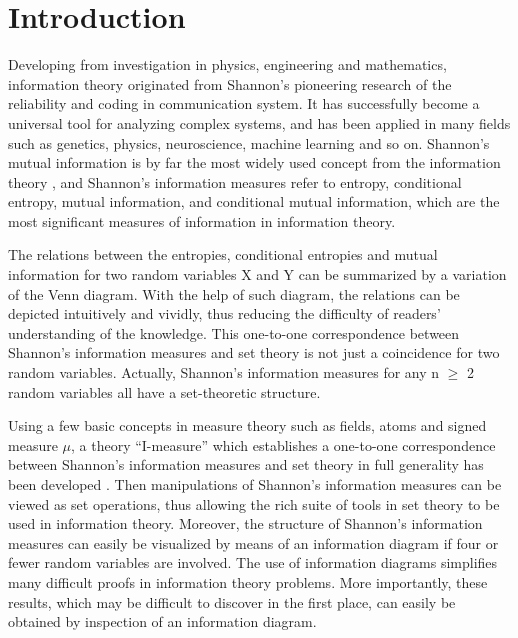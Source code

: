 \section{Introduction}



\qquad Developing from investigation in physics, engineering and mathematics, information theory originated from Shannon's pioneering research of the reliability and coding in communication system. It has successfully become a universal tool for analyzing complex systems, and has been applied in many fields such as genetics, physics, neuroscience, machine learning and so on. Shannon’s mutual information is by far the most widely used concept from the information theory \cite{shannon1948mathematical}, and Shannon’s information measures refer to entropy, conditional entropy, mutual information, and conditional mutual information, which are the most significant measures of information in information theory. 


The relations between the entropies, conditional entropies and mutual information for two random variables X and Y can be summarized by a variation of the Venn diagram. With the help of such diagram, the relations can be depicted intuitively and vividly, thus reducing the difficulty of readers' understanding of the knowledge. This one-to-one correspondence between Shannon’s information measures and set theory is not just a coincidence for two random variables. Actually, Shannon’s information measures for any n $\geq$ 2 random variables all have a set-theoretic structure.

Using a few basic concepts in measure theory such as fields, atoms and signed measure $\mu$, a theory “I-measure” which establishes a one-to-one correspondence between Shannon’s information measures and set theory in full generality has been developed \cite{yeung2008information,yeung2012first}. Then manipulations of Shannon’s information measures can be viewed as set operations, thus allowing the rich suite of tools in set theory to be used in information theory. Moreover, the structure of Shannon’s information measures can easily be visualized by means of an information diagram if four or fewer random variables are involved. The use of information diagrams simplifies many difficult proofs in information theory problems. More importantly, these results, which may be difficult to discover in the first place, can easily be obtained by inspection of an information diagram.

